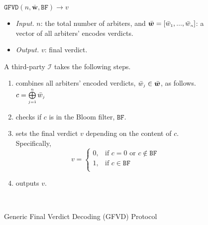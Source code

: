 %
\begin{figure}[hbt!]
\setlength{\fboxsep}{0.7pt}
\begin{center}
\begin{boxedminipage}{12.4cm}
\small{
\underline{$\mathtt{GFVD}(n,  \bar{\bm w}, \mathtt{BF})\rightarrow  v$}\\
%
\begin{itemize}
\item \noindent\textit{Input.} $n$:  the total number of  arbiters,  and  $\bar{\bm w}=[\bar{ w}_{\scriptscriptstyle 1},..., \bar{ w}_{\scriptscriptstyle n}]$:  a vector of all arbiters' encodes  verdicts.
%
\item \noindent\textit{Output.} $v$: final verdict.  
%
\end{itemize}
A third-party $\mathcal{I}$ takes the following steps.
\begin{enumerate}
%
%
\item combines  all arbiters' encoded verdicts, $\bar w_{\scriptscriptstyle j}\in \bar{\bm {w}}$, as follows. 
%
$c= \bigoplus\limits^{\scriptscriptstyle n}_{\scriptscriptstyle j=1} \bar w_{\scriptscriptstyle j}$
%
%
\item checks if $c$ is in the Bloom filter, $\mathtt{BF}$. 
%
\item sets the final verdict $v$ depending on the content of $c$. Specifically, 
%
\begin{equation*}
   v= 
\begin{cases}
    0,              &\text{if } c= 0 \text{ or } c \notin\mathtt{BF}\\
   1 ,& \text{if } c \in\mathtt{BF}\\

\end{cases}
\end{equation*}
%
\item outputs  $v$. 

\
 \end{enumerate}
 
}
\end{boxedminipage}
\end{center}
\caption{Generic Final Verdict Decoding  (GFVD) Protocol} 
\label{fig:GFVD}
\end{figure}

